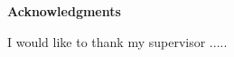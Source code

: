 \vspace*{\fill}
\begin{center}
\textbf{Acknowledgments}
\end{center}
\begin{center}
I would like to thank my supervisor .....
\end{center}
\vspace*{\fill}
\newpage
\thispagestyle{empty}
\cleardoublepage